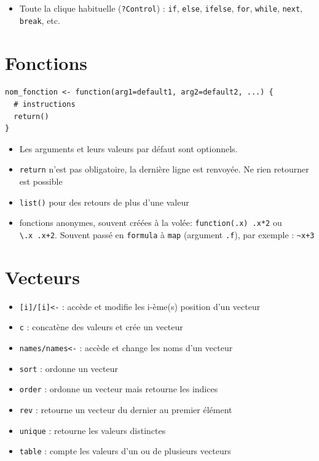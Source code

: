 \documentclass[
  letterpaper,
  DIV=11,
  numbers=noendperiod]{scrreprt}
\providecommand{\tightlist}{%
  \setlength{\itemsep}{0pt}\setlength{\parskip}{0pt}}\usepackage{longtable,booktabs,array}
\begin{document}
\begin{itemize}
\tightlist
\item
  Toute la clique habituelle (\texttt{?Control}) : \texttt{if},
  \texttt{else}, \texttt{ifelse}, \texttt{for}, \texttt{while},
  \texttt{next}, \texttt{break}, etc.
\end{itemize}

\hypertarget{fonctions-2}{%
\section{Fonctions}\label{fonctions-2}}

\begin{verbatim}
nom_fonction <- function(arg1=default1, arg2=default2, ...) {
  # instructions
  return()
}
\end{verbatim}

\begin{itemize}
\tightlist
\item
  Les arguments et leurs valeurs par défaut sont optionnels.
\item
  \texttt{return} n'est pas obligatoire, la dernière ligne est renvoyée.
  Ne rien retourner est possible
\item
  \texttt{list()} pour des retours de plus d'une valeur
\item
  fonctions anonymes, souvent créées à la volée:
  \texttt{function(.x)\ .x*2} ou \texttt{\textbackslash{}.x\ .x+2}.
  Souvent passé en \texttt{formula} à \texttt{map} (argument
  \texttt{.f}), par exemple : \texttt{\textasciitilde{}x+3}
\end{itemize}

\hypertarget{vecteurs}{%
\section{Vecteurs}\label{vecteurs}}

\begin{itemize}
\tightlist
\item
  \texttt{{[}i{]}/{[}i{]}\textless{}-} : accède et modifie les i-ème(s)
  position d'un vecteur
\item
  \texttt{c} : concatène des valeurs et crée un vecteur
\item
  \texttt{names/names\textless{}-} : accède et change les noms d'un
  vecteur
\item
  \texttt{sort} : ordonne un vecteur
\item
  \texttt{order} : ordonne un vecteur mais retourne les indices
\item
  \texttt{rev} : retourne un vecteur du dernier au premier élément
\item
  \texttt{unique} : retourne les valeurs distinctes
\item
  \texttt{table} : compte les valeurs d'un ou de plusieurs vecteurs
\end{itemize}
\end{document}

